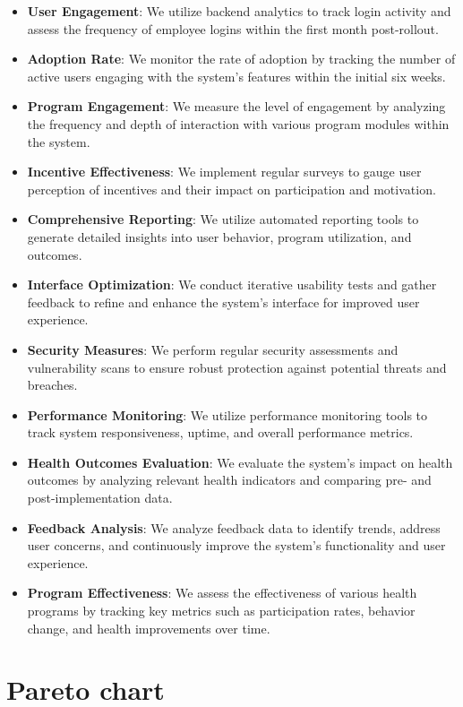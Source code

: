 \begin{itemize}
    \item \textbf{User Engagement}: We utilize backend analytics to track login activity and assess the frequency of employee logins within the first month post-rollout.
    \item \textbf{Adoption Rate}: We monitor the rate of adoption by tracking the number of active users engaging with the system's features within the initial six weeks.
    \item \textbf{Program Engagement}: We measure the level of engagement by analyzing the frequency and depth of interaction with various program modules within the system.
    \item \textbf{Incentive Effectiveness}: We implement regular surveys to gauge user perception of incentives and their impact on participation and motivation.
    \item \textbf{Comprehensive Reporting}: We utilize automated reporting tools to generate detailed insights into user behavior, program utilization, and outcomes.
    \item \textbf{Interface Optimization}: We conduct iterative usability tests and gather feedback to refine and enhance the system's interface for improved user experience.
    \item \textbf{Security Measures}: We perform regular security assessments and vulnerability scans to ensure robust protection against potential threats and breaches.
    \item \textbf{Performance Monitoring}: We utilize performance monitoring tools to track system responsiveness, uptime, and overall performance metrics.
    \item \textbf{Health Outcomes Evaluation}: We evaluate the system's impact on health outcomes by analyzing relevant health indicators and comparing pre- and post-implementation data.
    \item \textbf{Feedback Analysis}: We analyze feedback data to identify trends, address user concerns, and continuously improve the system's functionality and user experience.
    \item \textbf{Program Effectiveness}: We assess the effectiveness of various health programs by tracking key metrics such as participation rates, behavior change, and health improvements over time.
\end{itemize}

\section{Pareto chart}

